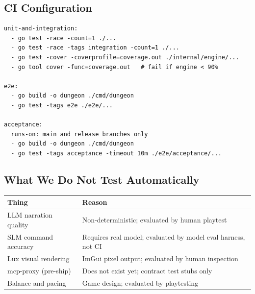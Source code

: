 \documentclass[a4paper,10pt]{article}
\begin{document}
\subsection{CI Configuration}

\begin{lstlisting}[title={.github/workflows/test.yml (target layout)}]
unit-and-integration:
  - go test -race -count=1 ./...
  - go test -race -tags integration -count=1 ./...
  - go test -cover -coverprofile=coverage.out ./internal/engine/...
  - go tool cover -func=coverage.out   # fail if engine < 90%

e2e:
  - go build -o dungeon ./cmd/dungeon
  - go test -tags e2e ./e2e/...

acceptance:
  runs-on: main and release branches only
  - go build -o dungeon ./cmd/dungeon
  - go test -tags acceptance -timeout 10m ./e2e/acceptance/...
\end{lstlisting}

\subsection{What We Do Not Test Automatically}

\begin{center}
\begin{tabular}{lp{8cm}}
\toprule
\textbf{Thing} & \textbf{Reason} \\
\midrule
LLM narration quality     & Non-deterministic; evaluated by human playtest \\
SLM command accuracy      & Requires real model; evaluated by model eval harness, not CI \\
Lux visual rendering      & ImGui pixel output; evaluated by human inspection \\
mcp-proxy (pre-ship)      & Does not exist yet; contract test stubs only \\
Balance and pacing        & Game design; evaluated by playtesting \\
\bottomrule
\end{tabular}
\end{center}
\end{document}
